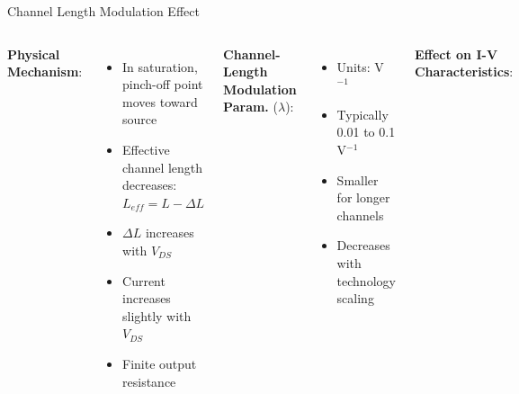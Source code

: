\documentclass[10pt, aspectratio=169]{beamer}
\begin{document}
\begin{frame}{Channel Length Modulation Effect}
    
    \begin{columns}[t]
        \textbf{Physical Mechanism}:
        
        \begin{itemize}
            \item In saturation, pinch-off point moves toward source
            \item Effective channel length decreases: $L_{eff} = L - \Delta L$
            \item $\Delta L$ increases with $V_{DS}$
            \item Current increases slightly with $V_{DS}$
            \item Finite output resistance
        \end{itemize}
        
        \textbf{Channel-Length Modulation Param.} ($\lambda$):
        
        \begin{itemize}
            \item Units: V$^{-1}$
            \item Typically 0.01 to 0.1 V$^{-1}$
            \item Smaller for longer channels
            \item Decreases with technology scaling
        \end{itemize}
        
        \textbf{Effect on I-V Characteristics}:
        
        \begin{center}
\end{center}
\end{columns}
\end{frame}
\end{document}
